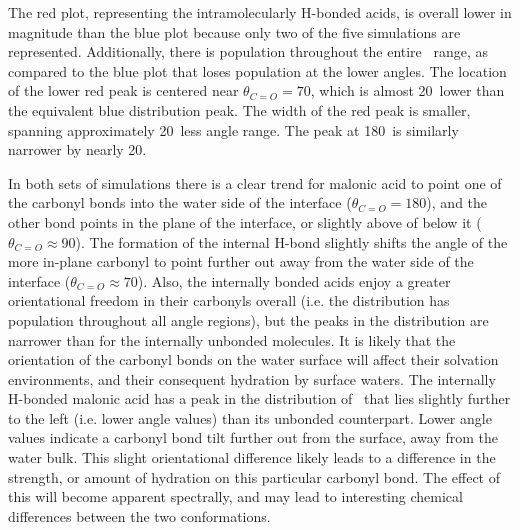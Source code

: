 The red plot, representing the intramolecularly H-bonded acids, is overall lower in magnitude than the blue plot because only two of the five simulations are represented. Additionally, there is population throughout the entire \thetacarb~range, as compared to the blue plot that loses population at the lower angles. The location of the lower red peak is centered near $\theta_{C=O}=70$\degr, which is almost 20\degr~lower than the equivalent blue distribution peak. The width of the red peak is smaller, spanning approximately 20\degr~less angle range. The peak at 180\degr~is similarly narrower by nearly 20\degr.

In both sets of simulations there is a clear trend for malonic acid to point one of the carbonyl bonds into the water side of the interface ($\theta_{C=O}=180$\degr), and the other bond points in the plane of the interface, or slightly above of below it ($\theta_{C=O} \approx 90$\degr). The formation of the internal H-bond slightly shifts the angle of the more in-plane carbonyl to point further out away from the water side of the interface ($\theta_{C=O} \approx 70$\degr). Also, the internally bonded acids enjoy a greater orientational freedom in their carbonyls overall (i.e. the distribution has population throughout all angle regions), but the peaks in the distribution are narrower than for the internally unbonded molecules. It is likely that the orientation of the carbonyl bonds on the water surface will affect their solvation environments, and their consequent hydration by surface waters. The internally H-bonded malonic acid has a peak in the distribution of \thetacarb~that lies slightly further to the left (i.e. lower angle values) than its unbonded counterpart. Lower angle values indicate a carbonyl bond tilt further out from the surface, away from the water bulk. This slight orientational difference likely leads to a difference in the strength, or amount of hydration on this particular carbonyl bond. The effect of this will become apparent spectrally, and may lead to interesting chemical differences between the two conformations.

